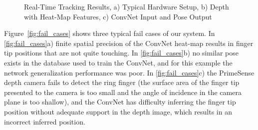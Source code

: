 \begin{figure}[ht]
\begin{subfigure}{0.28125\textwidth}
                \caption{\footnotesize }
        \end{subfigure}
        \caption{Real-Time Tracking Results, a) Typical Hardware Setup, b) Depth with Heat-Map Features, c) ConvNet Input and Pose Output}
        \label{fig:screenshots}
\end{figure}

Figure~\ref{fig:fail_cases} shows three typical fail cases of our system. In \ref{fig:fail_cases}a) finite spatial precision of the ConvNet heat-map results in finger tip positions that are not quite touching. In \ref{fig:fail_cases}b) no similar pose exists in the database used to train the ConvNet, and for this example the network generalization performance was poor. In \ref{fig:fail_cases}c) the PrimeSense depth camera fails to detect the ring finger (the surface area of the finger tip presented to the camera is too small and the angle of incidence in the camera plane is too shallow), and the ConvNet has difficulty inferring the finger tip position without adequate support in the depth image, which results in an incorrect inferred position.

